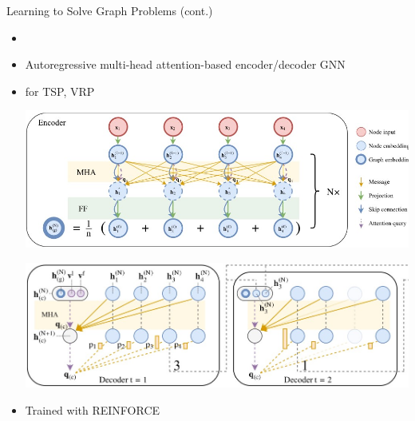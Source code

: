\documentclass[aspectratio=1610]{beamer}
\newcommand{\important}[1]{{\color{green!60!black}#1}}
\begin{document}

\begin{frame}{Learning to Solve Graph Problems (cont.)}
	\begin{itemize}
		\item {}
		\item Autoregressive multi-head attention-based encoder/decoder GNN
		\item for TSP, VRP
		\begin{center}
			\includegraphics[width=0.7\linewidth]{graphics/MHA-encoder.jpg}
		\end{center}
		\begin{center}
			\includegraphics[width=0.7\linewidth]{graphics/MHA-decoder.jpg}
		\end{center}
		\item Trained with REINFORCE
	\end{itemize}
\end{frame}
\end{document}
